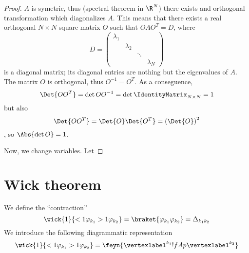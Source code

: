 \begin{proof}
   $A$ is symetric, thus (spectral theorem in $\R^{N}$) there exists and
   orthogonal transformation which diagonalizes $A$. This means that there
   exists a real orthogonal $N\times N$ square matrix  $O$ such
   that $OAO^{T}=D$, where
   \begin{dmath*}
      D = \begin{pmatrix} \lambda_{1} \\ & \lambda_{2} \\ && \ddots \\ &&&
	 \lambda_{N} \end{pmatrix}
   \end{dmath*}
   is a diagonal matrix; its diagonal entries are nothing but the eigenvalues of $A$.
   The matrix $O$ is orthogonal, thus $O^{-1} = O^{T}$.
   As a conseguence,
   \begin{dmath*}[compact]
      \Det {OO^{T}} = \det{OO^{-1}} = \det{\IdentityMatrix_{N\times N}} = 1 
   \end{dmath*}
   but also
   \begin{dmath*}[compact]
      \Det {OO^{T}} = \Det{O} \Det{O^{T}}  = \left( \Det{O} \right)^{2}
   \end{dmath*},
   so $\Abs{\det{O}} =1$.

   Now, we change variables. Let





\end{proof}




\section{Wick theorem}

We define the ``contraction''
   \begin{equation}
   \wick{1}{<1 \varphi_{k_{1}} >1\varphi_{k_{2}} }=
   \braket{\varphi_{k_{1}} \varphi_{k_{2}}} = \Delta_{k_{1}k_{2}}
\end{equation}
We introduce the following diagrammatic representation
\begin{dmath}[compact]
   \wick{1}{<1 \varphi_{k_{1}} >1\varphi_{k_{2}} }=
   \feyn{\vertexlabel^{k_{1}} !{fA}p \vertexlabel^{k_{2}}}
\end{dmath}

